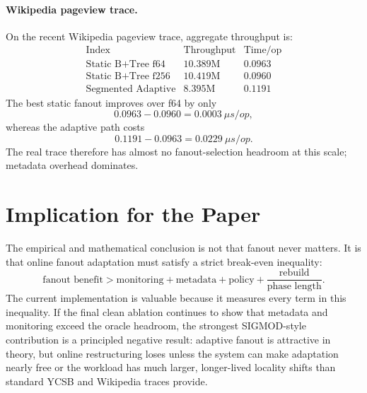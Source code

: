 \paragraph{Wikipedia pageview trace.}
On the recent Wikipedia pageview trace, aggregate throughput is:
\[
\begin{array}{lrr}
\text{Index} & \text{Throughput} & \text{Time/op} \\
\hline
\text{Static B+Tree f64} & 10.389\text{M} & 0.0963 \\
\text{Static B+Tree f256} & 10.419\text{M} & 0.0960 \\
\text{Segmented Adaptive} & 8.395\text{M} & 0.1191
\end{array}
\]
The best static fanout improves over f64 by only
\[
  0.0963 - 0.0960 = 0.0003\ \mu s/op,
\]
whereas the adaptive path costs
\[
  0.1191 - 0.0963 = 0.0229\ \mu s/op.
\]
The real trace therefore has almost no fanout-selection headroom at this scale;
metadata overhead dominates.

\section{Implication for the Paper}
\label{sec:math-implication}

The empirical and mathematical conclusion is not that fanout never matters.  It
is that online fanout adaptation must satisfy a strict break-even inequality:
\[
  \text{fanout benefit} > \text{monitoring} + \text{metadata}
  + \text{policy} + \frac{\text{rebuild}}{\text{phase length}}.
\]
The current implementation is valuable because it measures every term in this
inequality.  If the final clean ablation continues to show that metadata and
monitoring exceed the oracle headroom, the strongest SIGMOD-style contribution
is a principled negative result: adaptive fanout is attractive in theory, but
online restructuring loses unless the system can make adaptation nearly free or
the workload has much larger, longer-lived locality shifts than standard YCSB
and Wikipedia traces provide.
